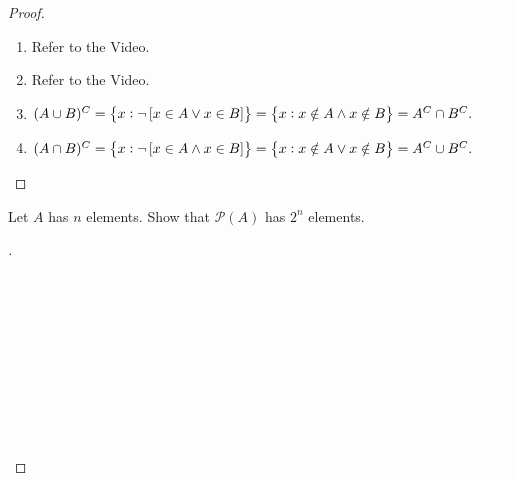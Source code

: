 \documentclass[11pt,openany]{article}
\begin{document}
\begin{proof}
{\color{white}	\begin{enumerate}[(1)]
		\item Refer to the Video.
		\item Refer to the Video.
		\item {$(A\cup B)^C=\set{x:\lnot\left[x\in A\lor x\in B\right]}=\set{x:x\notin A\land x\notin B}=A^C\cap B^C.$}
		\item {$(A\cap B)^C=\set{x:\lnot\left[x\in A\land x\in B\right]}=\set{x:x\notin A\lor x\notin B}=A^C\cup B^C.$}
	\end{enumerate}}
\vspace{360pt}
\end{proof}

\newpage
\begin{exercise*}
	Let $A$ has $n$ elements. Show that $\mathcal{P}(A)$ has $2^n$ elements.
	\begin{proof}[\sol] 
		\textcolor{white}{\begin{itemize}
			\item[(pf 1)] For each element of $A$, there are two choices:
			\begin{enumerate}
				\item Include the element in the subset.
				\item Exclude the element from the subset.
			\end{enumerate}
			Since we have two independent choices (include or exclude), the total number of subsets is:
			\[
			\underbrace{2\times 2\times\cdots 2}_{n\ \text{times}}=2^n.
			\]
			\vspace{400pt}
		\end{itemize}}
	\end{proof}
\end{exercise*}
\end{document}
